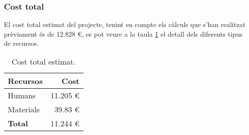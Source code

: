 \subsubsection{Cost total}

El cost total estimat del projecte, tenint en compte els càlculs que s'han realitzat prèviament és de 12.828 \euro, es pot veure a la taula \ref{totalCost} el detall dels diferents tipus de recursos.

\begin{table}[ht]
    \begin{center}
    \begin{tabular}{| l | r |}
        \hline
            \textbf{Recursos}       & \textbf{Cost}     \\ 
        \hline
            Humans                  & 11.205  \euro     \\
            Materials               & 39.83    \euro    \\ 
        \hline
            \textbf{Total}          & 11.244  \euro     \\
        \hline
    \end{tabular}
    \end{center}
    \caption{ Cost total estimat.\label{totalCost}}
\end{table}
